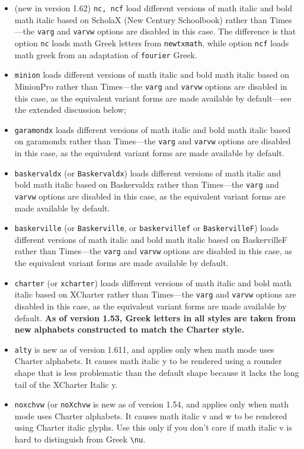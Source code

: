 \documentclass[\fsc]{article}
\theoremstyle{oldplain}
\theoremstyle{plain}
\begin{document}
\begin{itemize}
\item (new in version 1.62) {\tt nc, ncf} load different versions of math italic and bold math italic based on \textsf{ScholaX} (\textsf{New Century Schoolbook}) rather than \textsf{Times}---the {\tt varg} and {\tt varvw} options are disabled in this case. The difference is that option {\tt nc} loads math Greek letters from {\tt newtxmath}, while option {\tt ncf} loads math greek from an adaptation of {\tt fourier} Greek.
\item {\tt minion} loads different versions of math italic and bold math italic based on \textsf{MinionPro} rather than \textsf{Times}---the {\tt varg} and {\tt varvw} options are disabled in this case, as the equivalent variant forms are made available by default---see the extended discussion below;
\item {\tt garamondx} loads different versions of math italic and bold math italic based on \textsf{garamondx} rather than \textsf{Times}---the {\tt varg} and {\tt varvw} options are disabled in this case, as the equivalent variant forms are made available by default.
\item {\tt baskervaldx} (or {\tt Baskervaldx}) loads different versions of math italic and bold math italic based on \textsf{Baskervaldx} rather than \textsf{Times}---the {\tt varg} and {\tt varvw} options are disabled in this case, as the equivalent variant forms are made available by default.
\item {\tt baskerville} (or {\tt Baskerville}, or {\tt baskervillef} or {\tt BaskervilleF}) loads different versions of math italic and bold math italic based on \textsf{BaskervilleF} rather than \textsf{Times}---the {\tt varg} and {\tt varvw} options are disabled in this case, as the equivalent variant forms are made available by default.
\item {\tt charter} (or {\tt xcharter}) loads different versions of math italic and bold math italic based on \textsf{XCharter} rather than \textsf{Times}---the {\tt varg} and {\tt varvw} options are disabled in this case, as the equivalent variant forms are made available by default. \textbf{As of version 1.53, Greek letters in all styles are taken from  new alphabets constructed to match the Charter style.}
\item {\tt alty}  is new as of version 1.611, and applies only when math mode uses Charter alphabets. It causes math italic y to be rendered using a rounder shape that is less problematic than the default shape because it lacks the long tail of the XCharter Italic {y}.
\item {\tt noxchvw} (or {\tt noXchvw} is new as of version 1.54, and applies only when math mode uses Charter alphabets. It causes math italic v and w to be rendered using Charter italic glyphs. Use this only if you don't care if math italic v is hard to distinguish from Greek \verb|\nu|.


\end{itemize}
\end{document}
